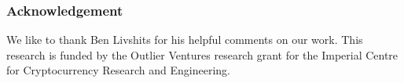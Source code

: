 \subsubsection{Acknowledgement}
We like to thank Ben Livshits for his helpful comments on our work. This research is funded by the Outlier Ventures research grant for the Imperial Centre for Cryptocurrency Research and Engineering.
